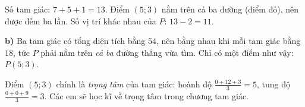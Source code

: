 {
Số tam giác: $7+5+1=13$. Điểm $(5;3)$ nằm trên cả ba đường (điểm đỏ), nên được đếm ba lần. Số vị trí khác
nhau của $P$: $13-2=11$.

\textbf{b)}
Ba tam giác có tổng diện tích bằng $54$, nên bằng nhau khi mỗi tam giác bằng $18$, tức $P$ phải nằm trên
\emph{cả ba} đường thẳng vừa tìm. Chỉ có một điểm như vậy: $P(5;3)$.

\begin{tipbox}Điểm $(5;3)$ chính là \emph{trọng tâm} của tam giác: hoành độ $\tfrac{0+12+3}{3}=5$, tung độ
$\tfrac{0+0+9}{3}=3$. Các em sẽ học kĩ về trọng tâm trong chương tam giác.\end{tipbox}
}

